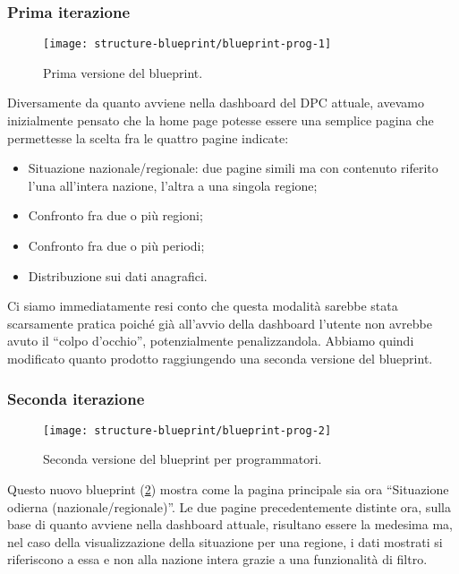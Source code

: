 \subsubsection{Prima iterazione}
\begin{figure}[H]
    \centering
    \texttt{[image: structure-blueprint/blueprint-prog-1]}
    \caption{Prima versione del blueprint.}\label{fig:blueprint-prog-1}
\end{figure}
Diversamente da quanto avviene nella dashboard del DPC attuale, avevamo inizialmente pensato che la home page potesse essere una semplice pagina che permettesse la scelta fra le quattro pagine indicate:
\begin{itemize}
    \item Situazione nazionale/regionale: due pagine simili ma con contenuto riferito l'una all'intera nazione, l'altra a una singola regione;
    \item Confronto fra due o più regioni;
    \item Confronto fra due o più periodi;
    \item Distribuzione sui dati anagrafici.
\end{itemize}
Ci siamo immediatamente resi conto che questa modalità sarebbe stata scarsamente pratica poiché già all'avvio della dashboard l'utente non avrebbe avuto il ``colpo d'occhio'', potenzialmente penalizzandola. Abbiamo quindi modificato quanto prodotto raggiungendo una seconda versione del blueprint.

\subsubsection{Seconda iterazione}
\begin{figure}[H]
    \centering
    \texttt{[image: structure-blueprint/blueprint-prog-2]}
    \caption{Seconda versione del blueprint per programmatori.}\label{fig:blueprint-prog-2}
\end{figure}
Questo nuovo blueprint (\ref{fig:blueprint-prog-2}) mostra come la pagina principale sia ora ``Situazione odierna (nazionale/regionale)''. Le due pagine precedentemente distinte ora, sulla base di quanto avviene nella dashboard attuale, risultano essere la medesima ma, nel caso della visualizzazione della situazione per una regione,  i dati mostrati si riferiscono a essa e non alla nazione intera grazie a una funzionalità di filtro.\\


